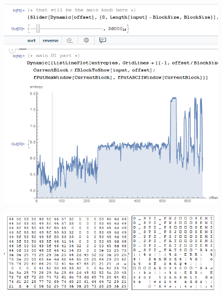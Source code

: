 \begin{figure}[H]
\centering
\includegraphics[width=\EntropyGfxScale]{ff/entropy/dashcam_text1.png}
\end{figure}

\begin{figure}[H]
\centering
\includegraphics[width=\EntropyGfxScale]{ff/entropy/dashcam_text2.png}
\end{figure}
